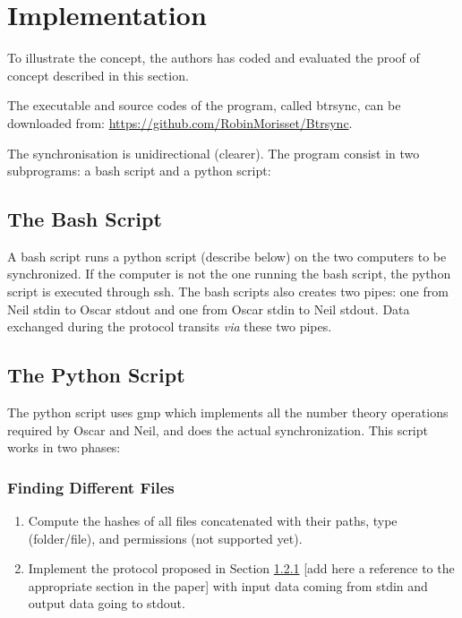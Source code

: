 \documentclass[11pt]{llncs}
\begin{document}
\section{Implementation}

To illustrate the concept, the authors has coded and evaluated the proof of concept described in this section.\smallskip

The executable and source codes of the program, called {\sf btrsync}, can be downloaded from: \url{https://github.com/RobinMorisset/Btrsync}.\smallskip

The synchronisation is unidirectional (clearer). The program consist in two subprograms: a bash script and a python script:

\subsection{The Bash Script}

A bash script runs a python script (describe below) on the two computers to be synchronized. If the computer is not the one running the bash script, the python script is executed through ssh. The bash scripts also creates two pipes: one from Neil stdin to Oscar stdout and one from Oscar stdin to Neil stdout. Data exchanged during the protocol transits {\sl via} these two pipes.

\subsection{The Python Script}

The python script uses gmp which implements all the number theory operations required by Oscar and Neil, and does the actual synchronization. This script works in two phases:

\subsubsection{Finding Different Files}

\begin{enumerate}
\item Compute the hashes of all files concatenated with their paths, type (folder/file), and permissions (not supported yet).
\item Implement the protocol proposed in Section \ref{} [add here a reference to the appropriate section in the paper] with input data coming from stdin and output data going to stdout.
\end{enumerate}
\end{document}
